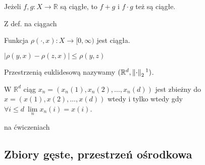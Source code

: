 \begin{tw} Jeżeli $f,g: X \rightarrow \mathbb{R}$ są ciągłe, to $f+g$ i $f \cdot g$ też są ciągłe. \end{tw} 
\begin{dd} Z def. na ciągach \end{dd} 
\begin{tw} Funkcja $\rho(\cdot,x): X \rightarrow [0,\infty)$ jest ciągła. \end{tw} 
\begin{dd} $| \rho(y,x) - \rho(z,x)| \le \rho(y,z)$ \end{dd} 
\begin{ozn} Przestrzenią euklidesową nazywamy $(\mathbb{R}^d,\norm{\cdot}_2\footnotemark)$. \end{ozn}
\begin{tw} W $\mathbb{R}^d$ ciąg $x_n = (x_n(1),x_n(2),\ldots,x_n(d))$ jest zbieżny do $x = (x(1),x(2),\ldots,x(d))$ wtedy i tylko wtedy gdy $\forall i \le d \ \lim\limits_n x_n(i) = x(i)$. \end{tw}
\begin{dd} na ćwiczeniach \end{dd}

\subsection{Zbiory gęste, przestrzeń ośrodkowa}

